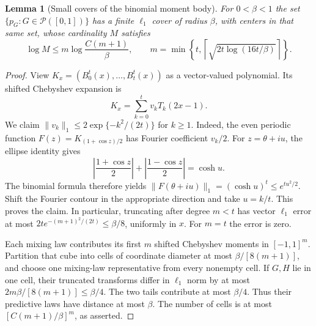 \documentclass[11pt,a4paper]{article}
\newtheorem{lemma}[theorem]{Lemma}
\theoremstyle{definition}
\theoremstyle{remark}
\numberwithin{equation}{section}
\begin{document}
\begin{lemma}[Small covers of the binomial moment body]
\label{E:p06:bm:cover}
For $0<\beta<1$ the set $\{p_G:G\in\mathcal P([0,1])\}$ has a finite
$\ell_1$ cover of radius $\beta$, with centers in that same set, whose
cardinality $M$ satisfies
\begin{equation}\label{E:p06:bm:entropy}
 \log M\le m\log\frac{C(m+1)}\beta,
 \qquad
 m=\min\left\{t,
       \left\lceil\sqrt{2t\log(16t/\beta)}\right\rceil\right\}.
\end{equation}
\end{lemma}
\begin{proof}
View $K_x=(B_0^t(x),\ldots,B_t^t(x))$ as a vector-valued polynomial.
Its shifted Chebyshev expansion is
\[
 K_x=\sum_{k=0}^t v_kT_k(2x-1).
\]
We claim $\|v_k\|_1\le2\exp\{-k^2/(2t)\}$ for $k\ge1$.
Indeed, the even periodic function
$F(z)=K_{(1+\cos z)/2}$ has Fourier coefficient $v_k/2$.
For $z=\theta+iu$, the ellipse identity gives
\[
 \left|\frac{1+\cos z}{2}\right|
 +\left|\frac{1-\cos z}{2}\right|=\cosh u.
\]
The binomial formula therefore yields
$\|F(\theta+iu)\|_1=(\cosh u)^t\le e^{tu^2/2}$.
Shift the Fourier contour in the appropriate direction and take
$u=k/t$. This proves the claim. In particular, truncating after degree
$m<t$ has vector $\ell_1$ error at most
$2t e^{-(m+1)^2/(2t)}\le\beta/8$, uniformly in $x$.
For $m=t$ the error is zero.

Each mixing law contributes its first $m$ shifted Chebyshev moments in
$[-1,1]^m$. Partition that cube into cells of coordinate diameter at most
$\beta/[8(m+1)]$, and choose one mixing-law representative from every
nonempty cell. If $G,H$ lie in one cell, their truncated transforms differ
in $\ell_1$ norm by at most
$2m\beta/[8(m+1)]\le\beta/4$. The two tails contribute at most
$\beta/4$. Thus their predictive laws have distance at most $\beta$.
The number of cells is at most $[C(m+1)/\beta]^m$, as asserted.
\end{proof}
\end{document}
